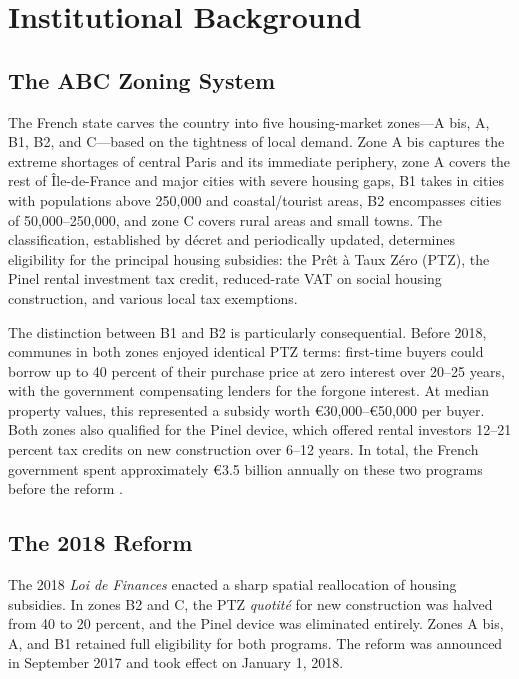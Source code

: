 \documentclass[12pt]{article}
\begin{document}
\section{Institutional Background}

\subsection{The ABC Zoning System}

The French state carves the country into five housing-market zones---A bis, A, B1, B2, and C---based on the tightness of local demand. Zone A bis captures the extreme shortages of central Paris and its immediate periphery, zone A covers the rest of \^{I}le-de-France and major cities with severe housing gaps, B1 takes in cities with populations above 250,000 and coastal/tourist areas, B2 encompasses cities of 50,000--250,000, and zone C covers rural areas and small towns. The classification, established by d\'{e}cret and periodically updated, determines eligibility for the principal housing subsidies: the Pr\^{e}t \`{a} Taux Z\'{e}ro (PTZ), the Pinel rental investment tax credit, reduced-rate VAT on social housing construction, and various local tax exemptions.

The distinction between B1 and B2 is particularly consequential. Before 2018, communes in both zones enjoyed identical PTZ terms: first-time buyers could borrow up to 40 percent of their purchase price at zero interest over 20--25 years, with the government compensating lenders for the forgone interest. At median property values, this represented a subsidy worth \euro{30,000}--\euro{50,000} per buyer. Both zones also qualified for the Pinel device, which offered rental investors 12--21 percent tax credits on new construction over 6--12 years. In total, the French government spent approximately \euro{3.5} billion annually on these two programs before the reform \citep{igf2019}.

\subsection{The 2018 Reform}

The 2018 \textit{Loi de Finances} enacted a sharp spatial reallocation of housing subsidies. In zones B2 and C, the PTZ \textit{quotit\'{e}} for new construction was halved from 40 to 20 percent, and the Pinel device was eliminated entirely. Zones A bis, A, and B1 retained full eligibility for both programs. The reform was announced in September 2017 and took effect on January 1, 2018.
\end{document}
